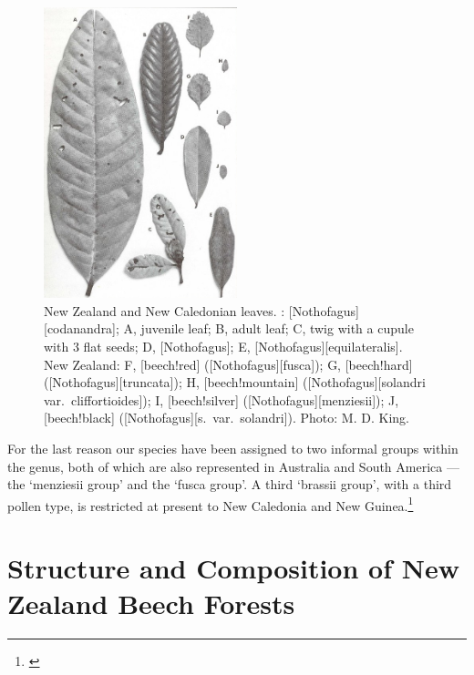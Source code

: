 \begin{figure}
	\includegraphics[width=0.5\textwidth]{graphics/figure70nothofagus.jpg}
	\centering
	\caption[New Zealand and New Caledonian Nothofagus leaves]{New Zealand and New Caledonian  leaves.
	: [Nothofagus][codanandra];
	A, juvenile leaf;
	B, adult leaf;
	C, twig with a cupule with 3 flat seeds;
	D, [Nothofagus];
	E, [Nothofagus][equilateralis].
	New Zealand:
	F, [beech!red] ([Nothofagus][fusca]);
	G, [beech!hard] ([Nothofagus][truncata]);
	H, [beech!mountain] ([Nothofagus][solandri var.\ cliffortioides]);
	I, [beech!silver] ([Nothofagus][menziesii]);
	J, [beech!black] ([Nothofagus][s.\ var.\ solandri]).
	Photo: M. D. King.}%
	\label{fig:70nothofagus}
\end{figure}

For the last reason our species have been assigned to two informal groups within the genus, both of which are also represented in Australia and South America --- the `menziesii group' and the `fusca group'.
A third `brassii group', with a third pollen type, is restricted at present to New Caledonia and New Guinea.\footnote{\cite{cranwell1939southern}}

\section{Structure and Composition of New Zealand Beech Forests}

